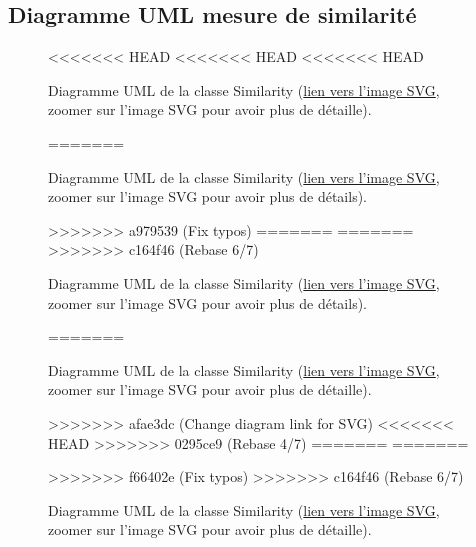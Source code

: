 \begin{appendices}
\section*{Diagramme UML mesure de similarité}\label{app:UMLSimilarity}
\begin{figure}[!htbp]
	\center
<<<<<<< HEAD
<<<<<<< HEAD
<<<<<<< HEAD
	\caption{Diagramme UML de la classe Similarity (\href{https://raw.githubusercontent.com/gabriel-combe/Cuttlefish_Tracker/main/rapport/UML/similarity.svg}{lien vers l'image SVG}, zoomer sur l'image SVG pour avoir plus de détaille).}
=======
	\caption{Diagramme UML de la classe Similarity (\href{https://raw.githubusercontent.com/gabriel-combe/Cuttlefish_Tracker/main/rapport/UML/similarity.svg}{lien vers l'image SVG}, zoomer sur l'image SVG pour avoir plus de détails).}
>>>>>>> a979539 (Fix typos)
=======
=======
>>>>>>> c164f46 (Rebase 6/7)
	\caption{Diagramme UML de la classe Similarity (\href{https://raw.githubusercontent.com/gabriel-combe/Cuttlefish_Tracker/main/rapport/UML/similarity.svg}{lien vers l'image SVG}, zoomer sur l'image SVG pour avoir plus de détails).}
=======
	\caption{Diagramme UML de la classe Similarity (\href{https://raw.githubusercontent.com/gabriel-combe/Cuttlefish_Tracker/test/rapport/UML/similarity.svg}{lien vers l'image SVG}, zoomer sur l'image SVG pour avoir plus de détaille).}
>>>>>>> afae3dc (Change diagram link for SVG)
<<<<<<< HEAD
>>>>>>> 0295ce9 (Rebase 4/7)
=======
=======
	\caption{Diagramme UML de la classe Similarity (\href{https://raw.githubusercontent.com/gabriel-combe/Cuttlefish_Tracker/main/rapport/UML/similarity.svg}{lien vers l'image SVG}, zoomer sur l'image SVG pour avoir plus de détaille).}
>>>>>>> f66402e (Fix typos)
>>>>>>> c164f46 (Rebase 6/7)
	\label{fig:uml_diagram_similarity}
\end{figure}
\FloatBarrier


\clearpage

\end{appendices}
